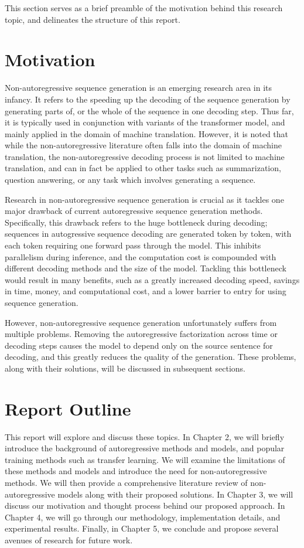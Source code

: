 
This section serves as a brief preamble of the motivation behind this research topic, and delineates the structure of this report. 

\section{Motivation} \label{sec:motivation}
Non-autoregressive sequence generation is an emerging research area in its infancy. It refers to the speeding up the decoding of the sequence generation by generating parts of, or the whole of the sequence in one decoding step. Thus far, it is typically used in conjunction with variants of the transformer model, and mainly applied in the domain of machine translation. However, it is noted \cite{wang_semi-autoregressive_2018} that while the non-autoregressive literature often falls into the domain of machine translation, the non-autoregressive decoding process is not limited to machine translation, and can in fact be applied to other tasks such as summarization, question answering, or any task which involves generating a sequence.

Research in non-autoregressive sequence generation is crucial as it tackles one major drawback of current autoregressive sequence generation methods. Specifically, this drawback refers to the huge bottleneck during decoding; sequences in autogressive sequence decoding are generated token by token, with each token requiring one forward pass through the model. This inhibits parallelism during inference, and the computation cost is compounded with different decoding methods and the size of the model. Tackling this bottleneck would result in many benefits, such as a greatly increased decoding speed, savings in time, money, and computational cost, and a lower barrier to entry for using sequence generation.

However, non-autoregressive sequence generation unfortunately suffers from multiple problems. Removing the autoregressive factorization across time or decoding steps causes the model to depend only on the source sentence for decoding, and this greatly reduces the quality of the generation. These problems, along with their solutions, will be discussed in subsequent sections.

\section{Report Outline} \label{sec:report_outline}
This report will explore and discuss these topics. In Chapter 2, we will briefly introduce the background of autoregressive methods and models, and popular training methods such as transfer learning. We will examine the limitations of these methods and models and introduce the need for non-autoregressive methods. We will then provide a comprehensive literature review of non-autoregressive models along with their proposed solutions. In Chapter 3, we will discuss our motivation and thought process behind our proposed approach. In Chapter 4, we will go through our methodology, implementation details, and experimental results. Finally, in Chapter 5, we conclude and propose several avenues of research for future work.

